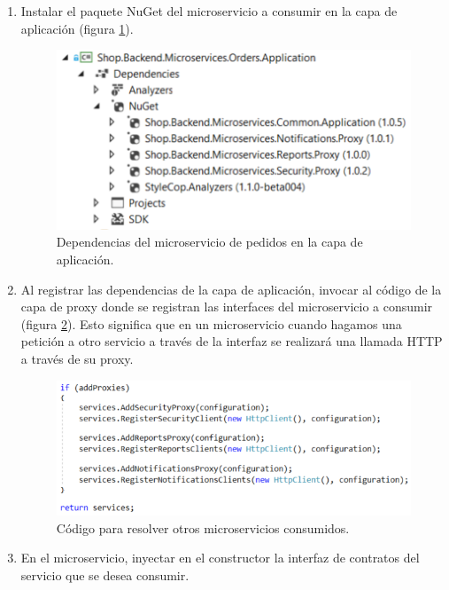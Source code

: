 \documentclass[11pt,spanish,listoffigures]{tfgetsinf}
\begin{document}
\begin{enumerate}

\item Instalar el paquete NuGet del microservicio a consumir en la capa de aplicación (figura \ref{fig:OrdersApplicationDependencies}).

\begin{figure}[h]
\centering
\includegraphics[scale=0.85]{OrdersApplicationDependencies}
\caption{Dependencias del microservicio de pedidos en la capa de aplicación.}
\label{fig:OrdersApplicationDependencies}
\end{figure}

\item Al registrar las dependencias de la capa de aplicación, invocar al código de la capa de proxy donde se registran las interfaces del microservicio a consumir (figura \ref{fig:UsingMicroservices}). Esto significa que en un microservicio cuando hagamos una petición a otro servicio a través de la interfaz se realizará una llamada HTTP a través de su proxy.

\begin{figure}[h]
\centering
\includegraphics[scale=0.85]{UsingMicroservices}
\caption{Código para resolver otros microservicios consumidos.}
\label{fig:UsingMicroservices}
\end{figure}

\item En el microservicio, inyectar en el constructor la interfaz de contratos del servicio que se desea consumir.

\end{enumerate}
\end{document}
